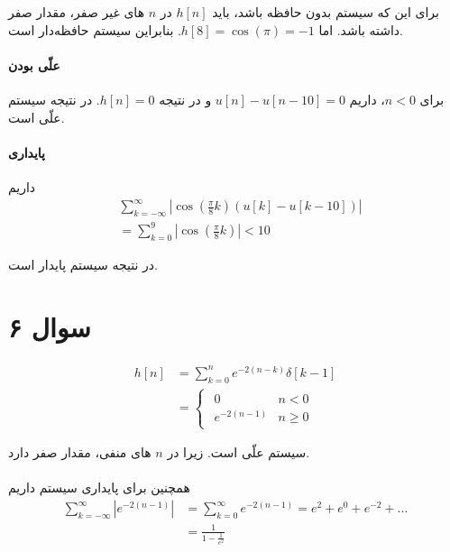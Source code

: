 \documentclass{article}
\begin{document}
	برای این که سیستم بدون حافظه باشد، باید
	$h[n]$
	در
	$n$
	های غیر صفر، مقدار صفر داشته باشد. اما
	$h[8] = \cos(\pi) = -1$.
	بنابراین سیستم حافظه‌دار است.

	\paragraph{علّی بودن}
	برای
	$n < 0$،
	داریم
	$u[n] - u[n-10] = 0$
	و در نتیجه
	$h[n] = 0$.
	در نتیجه سیستم علّی است.

	\paragraph*{پایداری}
	داریم
	\begin{align*}
		&\sum_{k=-\infty}^{\infty} |\cos(\frac{\pi}{8}k) (u[k] - u[k - 10])| \\
		&= \sum_{k=0}^{9} |\cos(\frac{\pi}{8}k)| < 10
	\end{align*}

	در نتیجه سیستم پایدار است.

	\section*{سوال ۶}
	\paragraph*{}

	\begin{align*}
		h[n] &= \sum_{k=0}^{n} e^{-2(n-k)} \delta[k-1] \\
		&= \begin{cases}
			\begin{matrix}
				0 & n < 0 \\
				e^{-2(n-1)} & n \ge 0
			\end{matrix}
		\end{cases}
	\end{align*}

	سیستم علّی است. زیرا در
	$n$
	های منفی، مقدار صفر دارد.

	\paragraph*{}
	همچنین برای پایداری سیستم داریم
	\begin{align*}
		\sum_{k=-\infty}^{\infty} |e^{-2(n-1)}| &= \sum_{k=0}^{\infty} e^{-2(n-1)} = e^2 + e^0 + e^{-2} + ... \\
		&= \frac{1}{1-\frac{1}{e^2}}
	\end{align*}
\end{document}
